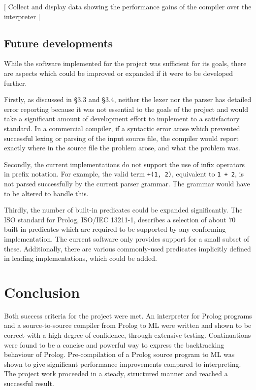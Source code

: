 \documentclass[12pt]{article}
\begin{document}
[ Collect and display data showing the performance gains of the compiler over the interpreter ]

\subsection{Future developments}

While the software implemented for the project was sufficient for its goals, there are aspects which could be improved or expanded if it were to be developed further.

Firstly, as discussed in \S3.3 and \S3.4, neither the lexer nor the parser has detailed error reporting because it was not essential to the goals of the project and would take a significant amount of development effort to implement to a satisfactory standard. 
In a commercial compiler, if a syntactic error arose which prevented successful lexing or parsing of the input source file, the compiler would report exactly where in the source file the problem arose, and what the problem was.

Secondly, the current implementations do not support the use of infix operators in prefix notation. 
For example, the valid term \verb|+(1, 2)|, equivalent to \verb|1 + 2|, is not parsed successfully by the current parser grammar. 
The grammar would have to be altered to handle this.

Thirdly, the number of built-in predicates could be expanded significantly. 
The ISO standard for Prolog, ISO/IEC 13211-1, describes a selection of about 70 built-in predicates which are required to be supported by any conforming implementation. 
The current software only provides support for a small subset of these.
Additionally, there are various commonly-used predicates implicitly defined in leading implementations, which could be added.

\newpage

\section{Conclusion}

Both success criteria for the project were met. An interpreter for Prolog programs and a source-to-source compiler from Prolog to ML were written and shown to be correct with a high degree of confidence, through extensive testing. Continuations were found to be a concise and powerful way to express the backtracking behaviour of Prolog. Pre-compilation of a Prolog source program to ML was shown to give significant performance improvements compared to interpreting. The project work proceeded in a steady, structured manner and reached a successful result. 
\end{document}
